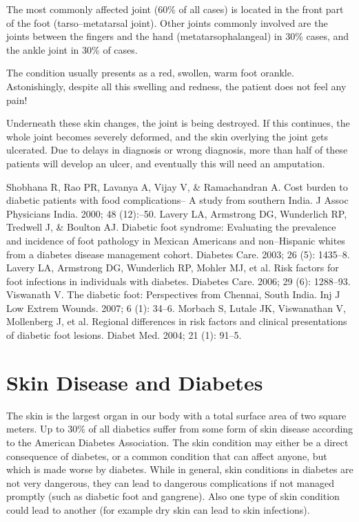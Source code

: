 The most commonly affected joint (60\% of all cases) is located in the front part of the foot (tarso–metatarsal joint). Other joints commonly involved are the joints between the fingers and the hand (metata\-rso\-pha\-la\-ngeal) in 30\% cases, and the ankle joint in 30\% of cases.

The condition usually presents as a red, swollen, warm foot or\break ankle. Astonishingly, despite all this swelling and redness, the patient does not feel any pain!

Underneath these skin changes, the joint is being destroyed. If this continues, the whole joint becomes severely deformed, and the skin overlying the joint gets ulcerated. Due to delays in diagnosis or wrong diagnosis, more than half of these patients will develop an ulcer, and eventually this will need an amputation.

\vspace{-\topsep}
\begin{thebibliography}{99}
 Shobhana R, Rao PR, Lavanya A, Vijay V, \& Ramachandran A. Cost burden to diabetic patients with food complications– A study from southern India. J Assoc Physicians India. 2000; 48 (12):–50.
 Lavery LA, Armstrong DG, Wunderlich RP, Tredwell J, \& Boulton AJ. Diabetic foot syndrome: Evaluating the prevalence and incidence of foot pathology in Mexican Americans and non–Hispanic whites from a diabetes disease management cohort. Diabetes Care. 2003; 26 (5): 1435–8.
 Lavery LA, Armstrong DG, Wunderlich RP, Mohler MJ, et al. Risk factors for foot infections in individuals with diabetes. Diabetes Care. 2006; 29 (6): 1288–93.
 Viswanath V. The diabetic foot: Perspectives from Chennai, South India. Inj J Low Extrem Wounds. 2007; 6 (1): 34–6.
 Morbach S, Lutale JK, Viswanathan V, Mollenberg J, et al. Regional differences in risk factors and clinical presentations of diabetic foot lesions. Diabet Med. 2004; 21 (1): 91–5.
\end{thebibliography}

\newpage
 
\renewcommand{\thechapter}{\arabic{chapter}A}
\chapter{Skin Disease and Diabetes}\label{chap18A}

The skin is the largest organ in our body with a total surface area of two square meters. Up to 30\% of all diabetics suffer from some form of skin disease according to the American Diabetes Association. The skin condition may either be a direct consequence of diabetes, or a common condition that can affect anyone, but which is made worse by diabetes. While in general, skin conditions in diabetes are not very dangerous, they can lead to dangerous complications if not managed promptly (such as diabetic foot and gangrene). Also one type of skin condition could lead to another (for example dry skin can lead to skin infections).

